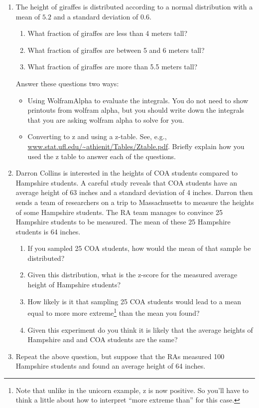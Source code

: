 \documentclass[12pt]{article}
\begin{document}
\begin{enumerate}
\setlength{\itemsep}{-1mm}
\item The height of giraffes is distributed according to a normal
  distribution with a mean of $5.2$ and a standard deviation of
  $0.6$.  
\begin{enumerate}
\setlength{\itemsep}{-1mm}
\item What fraction of giraffes are less than 4 meters tall?
\item What fraction of giraffes are between 5 and 6 meters tall?
\item What fraction of giraffes are more than 5.5 meters tall?
\end{enumerate}
Answer these questions two ways:
\begin{itemize}
\setlength{\itemsep}{-1mm}
\item Using WolframAlpha to evaluate the integrals.  You do not need
  to show printouts from wolfram alpha, but you should write down the
  integrals that you are asking wolfram alpha to solve for you.
\item Converting to z and using a z-table. See, e.g.,
  \url{www.stat.ufl.edu/~athienit/Tables/Ztable.pdf}.  Briefly explain
  how you used the z table to answer each of the questions. 
\end{itemize}

\item Darron Collins is interested in the heights of COA students
  compared to Hampshire students.  A careful study reveals that COA
  students have an average height of 63 inches and a standard deviation of 4
  inches.  Darron then sends a team of researchers on a trip to Massachusetts
  to measure the heights of some Hampshire students.  The RA team
  manages to convince 25 Hampshire students to be measured.  The mean
  of these 25 Hampshire students is 64 inches. 
\begin{enumerate}
\setlength{\itemsep}{-1mm}
  \item If you sampled 25 COA students, how would the mean of that
    sample be distributed? 
  \item Given this distribution, what is the z-score for the measured
    average height of Hampshire students?
  \item How likely is it that sampling 25 COA students would lead to a
    mean equal to more more extreme\footnote{Note that unlike in the
      unicorn example, z is now positive.  So you'll have to think a
      little about how to interpret ``more extreme than'' for this case.} than the mean you found?
  \item Given this experiment do you think it is likely that the
    average heights of Hampshire and and COA students are the 
    same? 
\end{enumerate}

\item Repeat the above question, but suppose that the RAs measured 100
  Hampshire students and found an average height of 64 inches.  

\end{enumerate}
\end{document}
